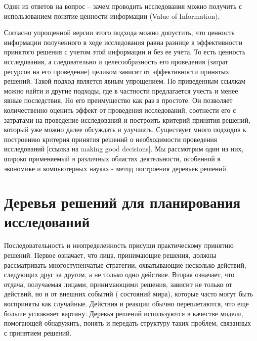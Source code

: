 Один из ответов на вопрос -- зачем проводить исследования можно получить с использованием понятие ценности информации (Value of Information). 


Согласно упрощенной версии этого подхода можно допустить, что ценность информации полученного в ходе исследования равна разнице в эффективности принятого решения с учетом этой информации и без ее учета. То есть ценность исследования, а следовательно и целесообразность его проведения (затрат ресурсов на его проведение) целиком зависит от эффективности принятых решений. 
Такой подход является явным упрощением. По приведенным ссылкам можно найти и другие подходы, где в частности предлагается учесть и менее явные последствия. Но его преимущество как раз в простоте. Он позволяет количественно оценить эффект от проведения исследований, соотнести его с затратами на проведение исследований и построить критерий принятия решений, который уже можно далее обсуждать и улучшать. 
Существует много подходов к построению критерия принятия решений о необходимости проведения исследований [ссылка на making good decisions]. Мы рассмотрим один из них, широко применяемый в различных областях деятельности, особенной в экономике и компьютерных науках - метод построения деревьев решений.

\section{Деревья решений для планирования исследований}

Последовательность и неопределенность присущи практическому принятию решений. Первое означает, что лица, принимающие решения, должны рассматривать многоступенчатые стратегии, охватывающие несколько действий, следующих друг за другом, а не только одно действие. Вторая означает, что отдача, получаемая лицами, принимающими решения, зависит не только от действий, но и от внешних событий ( состояний мира), которые часто могут быть восприняты как случайные. Действия и реакции обычно переплетаются, что еще больше усложняет картину. Деревья решений используются в качестве модели, помогающей обнаружить, понять и передать структуру таких проблем, связанных с принятием решений.

